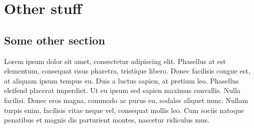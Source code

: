 \documentclass[12pt,oneside]{report}
\begin{document}
\chapter{Other stuff}
\section{Some other section}
Lorem ipsum dolor sit amet, consectetur adipiscing elit. Phasellus at est
elementum, consequat risus pharetra, tristique libero. Donec facilisis congue
est, at aliquam ipsum tempus eu. Duis a luctus sapien, at pretium leo. Phasellus
eleifend placerat imperdiet. Ut eu ipsum sed sapien maximus convallis. Nulla
facilisi. Donec eros magna, commodo ac purus eu, sodales aliquet nunc. Nullam
turpis enim, facilisis vitae neque vel, consequat mollis leo. Cum sociis natoque
penatibus et magnis dis parturient montes, nascetur ridiculus mus.
\end{document}
